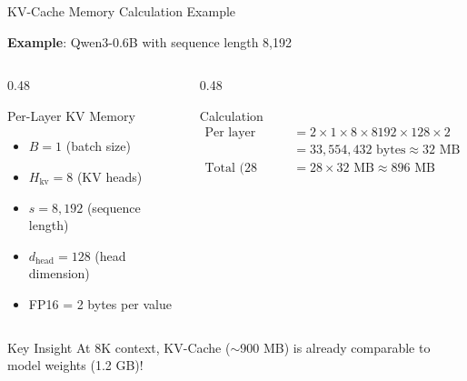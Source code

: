 \documentclass[aspectratio=169, 11pt]{beamer}
\begin{document}
\begin{frame}{KV-Cache Memory Calculation Example}

	\textbf{Example}: Qwen3-0.6B with sequence length 8,192

	\begin{columns}[T]
		\begin{column}{0.48\textwidth}
			\begin{block}{Per-Layer KV Memory}
				\begin{itemize}
					\item $B = 1$ (batch size)
					\item $H_{\text{kv}} = 8$ (KV heads)
					\item $s = 8{,}192$ (sequence length)
					\item $d_{\text{head}} = 128$ (head dimension)
					\item FP16 = 2 bytes per value
				\end{itemize}
			\end{block}
		\end{column}
		\begin{column}{0.48\textwidth}
			\begin{block}{Calculation}
				\begin{align*}
					\text{Per layer} &= 2 \times 1 \times 8 \times 8192 \times 128 \times 2 \\
					&= 33{,}554{,}432 \text{ bytes} \approx 32 \text{ MB} \\
					\text{Total (28 layers)} &= 28 \times 32 \text{ MB} \approx 896 \text{ MB}
				\end{align*}
			\end{block}
		\end{column}
	\end{columns}

	\begin{alertblock}{Key Insight}
		At 8K context, KV-Cache ($\sim$900 MB) is already comparable to model weights (1.2 GB)!
	\end{alertblock}

\end{frame}
\end{document}
